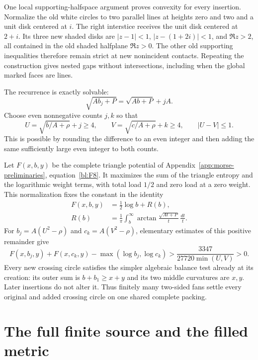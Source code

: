 One local supporting-halfspace argument proves convexity for every
insertion. Normalize the old white circles to two parallel lines at heights
zero and two and a unit disk centered at $i$. The right interstice
receives the unit disk centered at $2+i$. Its three new shaded disks
are $|z-1|<1$, $|z-(1+2i)|<1$, and $\Re z>2$, all contained in the old
shaded halfplane $\Re z>0$. The other old supporting inequalities
therefore remain strict at new nonincident contacts. Repeating the
construction gives nested gaps without intersections, including when
the global marked faces are lines.

The recurrence is exactly solvable:
\begin{equation}\label{bf:fan-recurrence}
 \sqrt{Ab_j+P}=\sqrt{Ab+P}+jA.
\end{equation}
Choose even nonnegative counts $j,k$ so that
\[
 U=\sqrt{b/A+\rho}+j\ge4,\qquad
 V=\sqrt{c/A+\rho}+k\ge4,\qquad |U-V|\le1.
\]
This is possible by rounding the difference to an even integer and
then adding the same sufficiently large even integer to both counts.

Let $F(x,b,y)$ be the complete triangle potential of
Appendix~\ref{app:morse-preliminaries}, equation~\eqref{bl:F8}. It
maximizes the sum of the triangle entropy and the logarithmic weight
terms, with total load $1/2$ and zero load at a zero weight. This
normalization fixes the constant in the identity
\begin{equation}\label{bf:remainder}
\begin{aligned}
 F(x,b,y)&=\tfrac12\log b+R(b),\\
 R(b)&=\frac1\pi\int_b^\infty
        \arctan\frac{\sqrt{At+P}}t\,\frac{dt}{t}.
\end{aligned}
\end{equation}
For $b_j=A(U^2-\rho)$ and $c_k=A(V^2-\rho)$, elementary estimates
of this positive remainder give
\begin{equation}\label{bf:strict-balance}
 F(x,b_j,y)+F(x,c_k,y)-\max(\log b_j,\log c_k)
     >\frac{3347}{27720\min(U,V)}>0.
\end{equation}
Every new crossing circle satisfies the simpler algebraic balance
test already at its creation: its outer sum is $b+b_1\ge x+y$ and
its two middle curvatures are $x,y$. Later insertions do not alter it.
Thus finitely many two-sided fans settle every original and added
crossing circle on one shared complete packing.

\section{The full finite source and the filled metric}

